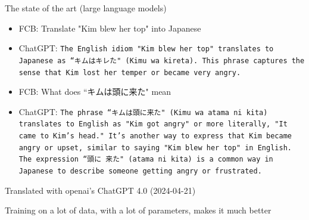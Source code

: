 \begin{frame}{The state of the art (large language models)}
  \begin{small}
    \begin{itemize}
    \item FCB: Translate "Kim blew her top" into Japanese
    \item ChatGPT:
      \texttt{The English idiom "Kim blew her top" translates to Japanese as ``キムはキレた" (Kimu wa kireta). This phrase captures the sense that Kim lost her temper or became very angry.}
    \item FCB: What does ``キムは頭に来た" mean
    \item ChatGPT:  \texttt{The phrase ``キムは頭に来た" (Kimu wa atama ni kita) translates to English as "Kim got angry" or more literally, "It came to Kim's head." It's another way to express that Kim became angry or upset, similar to saying "Kim blew her top" in English. \\
        The expression  ``頭に 来た" (atama ni kita) is a common way in Japanese to describe someone getting angry or frustrated.}
    \end{itemize}
  \end{small}
\hfill Translated with openai's ChatGPT 4.0 (2024-04-21)

Training on a lot of data, with a lot of parameters, makes it much better

\end{frame}

